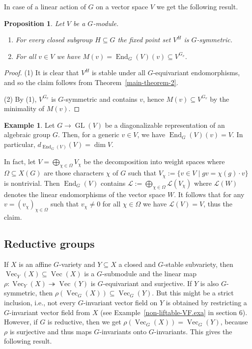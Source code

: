 \documentclass{amsart}
\newtheorem{prop}[thm]{Proposition}
\theoremstyle{definition}
\newtheorem{exa}[thm]{Example}
\theoremstyle{remark}
\begin{document}
In case of a linear action of $G$ on a vector space $V$ we get the following result.
\begin{prop}
Let $V$ be a  $G$-module.
\begin{enumerate}
\item For every closed subgroup $H {\subseteq} G$ the fixed point set $V^{H}$ is $G$-symmetric.
\item For all $v \in V$ we have $M(v)=\operatorname{End}_{G}(V)(v) {\subseteq} V^{G_{v}}$.
\end{enumerate}
\end{prop}
\begin{proof}
(1) It is clear that $V^{H}$ is stable under all $G$-equivariant endomorphisms, and so the claim follows from Theorem~\ref{main-theorem-2}.
\par\smallskip
(2) By (1), $V^{G_{v}}$ is $G$-symmetric and contains $v$, hence  $M(v) {\subseteq} V^{G_{v}}$ by the minimality of $M(v)$.
\end{proof}
\begin{exa}\label{diagonal.exa}
Let $G\to\operatorname{GL}(V)$ be a diagonalizable representation of an algebraic group $G$. Then, for a generic $v\in V$, we have $\operatorname{End}_{G}(V)(v) = V$. In particular, $d_{\operatorname{End}_{G}(V)}(V)=\dim V$.

In fact, let $V = \bigoplus_{\chi\in \Omega} V_{\chi}$ be the decomposition into weight spaces where $\Omega {\subseteq} X(G)$ are those characters $\chi$ of $G$ such that $V_{\chi}:=\{v\in V \mid gv=\chi(g)\cdot v\}$ is nontrivial. Then $\operatorname{End}_{G}(V)$ contains ${\mathcal L}:=\bigoplus_{\chi\in\Omega}{\mathcal L}(V_{\chi})$ where ${\mathcal L}(W)$ denotes the linear endomorphisms of the vector space $W$.  It follows that for any $v = (v_{\chi})_{\chi\in\Omega}$ such that $v_{\chi}\neq 0$ for all $\chi\in\Omega$ we have ${\mathcal L}(V) = V$, thus the claim.
\end{exa}

{\par\smallskip}
\subsection{Reductive groups}\label{RedGr.subsec}
If $X$ is an affine $G$-variety and $Y {\subseteq} X$ a closed and $G$-stable subvariety, then  $\operatorname{Vec}_{Y}(X) {\subseteq} \operatorname{Vec}(X)$ is a $G$-submodule and the linear map $\rho\colon\operatorname{Vec}_Y(X) {\twoheadrightarrow} \operatorname{Vec}(Y)$ is $G$-equivariant and surjective. If $Y$ is also $G$-symmetric, then $\rho(\operatorname{Vec}_{G}(X)) {\subseteq} \operatorname{Vec}_{G}(Y)$. But this might be a strict inclusion, i.e., not every $G$-invariant vector field on $Y$ is obtained by restricting a $G$-invariant vector field from $X$ (see Example~\ref{non-liftable-VF.exa} in section 6). However, if $G$ is reductive, then we get $\rho(\operatorname{Vec}_{G}(X)) = \operatorname{Vec}_{G}(Y)$, because $\rho$ is surjective and thus maps $G$-invariants onto $G$-invariants. This gives the following result.
\end{document}

